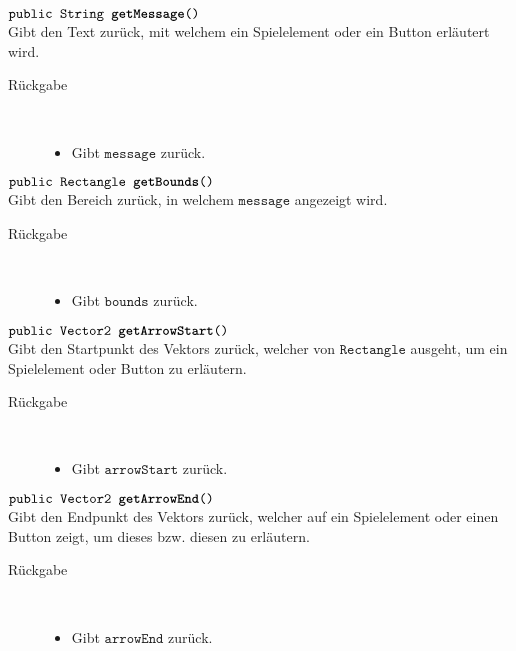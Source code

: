 \begin{description}
		\item $\texttt{public String \textbf{getMessage}()}$ \\ Gibt den Text zurück, mit welchem ein Spielelement oder ein Button erläutert wird.
		\begin{description}
			\item[Rückgabe] \hfill \\
			\vspace{-.8cm}
			\begin{itemize}
				\item Gibt $\texttt{message}$ zurück.
			\end{itemize}
			\end{description}

		\item $\texttt{public Rectangle \textbf{getBounds}()}$ \\ Gibt den Bereich zurück, in welchem $\texttt{message}$ angezeigt wird.
		\begin{description}
			\item[Rückgabe] \hfill \\
			\vspace{-.8cm}
			\begin{itemize}
				\item Gibt $\texttt{bounds}$ zurück.
			\end{itemize}
			\end{description}
			
		\item $\texttt{public Vector2 \textbf{getArrowStart}()}$ \\ Gibt den Startpunkt des Vektors zurück, welcher von $\texttt{Rectangle}$ ausgeht, um ein Spielelement oder Button zu erläutern.
		\begin{description}
			\item[Rückgabe] \hfill \\
			\vspace{-.8cm}
			\begin{itemize}
				\item Gibt $\texttt{arrowStart}$ zurück.
			\end{itemize}
			\end{description}

		\item $\texttt{public Vector2 \textbf{getArrowEnd}()}$ \\ Gibt den Endpunkt des Vektors zurück, welcher auf ein Spielelement oder einen Button zeigt, um dieses bzw. diesen zu erläutern.
		\begin{description}
			\item[Rückgabe] \hfill \\
			\vspace{-.8cm}
			\begin{itemize}
				\item Gibt $\texttt{arrowEnd}$ zurück.
			\end{itemize}
			\end{description}

		
	\end{description}
